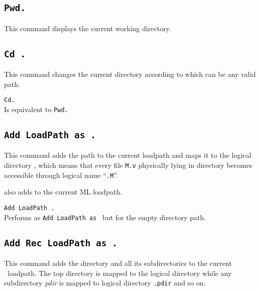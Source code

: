 \subsection[\tt Pwd.]{\tt Pwd.\label{Pwd}}
This command displays the current working directory.

\subsection[\tt Cd {\str}.]{\tt Cd {\str}.}
This command changes the current directory according to {\str} 
which can be any valid path.

\begin{Variants}
\item {\tt Cd.}\\
  Is equivalent to {\tt Pwd.}
\end{Variants}

\subsection[\tt Add LoadPath {\str} as {\dirpath}.]{\tt Add LoadPath {\str} as {\dirpath}.\label{AddLoadPath}}

This command adds the path {\str} to the current {\Coq} loadpath and
maps it to the logical directory {\dirpath}, which means that every
file {\tt M.v} physically lying in directory {\str} becomes accessible
through logical name ``{\dirpath}{\tt{.M}}''. 

 also adds {\str} to the current ML loadpath.

\begin{Variants}
\item {\tt Add LoadPath {\str}.}\\
Performs as {\tt Add LoadPath {\str} as {\dirpath}} but for the empty directory path.
\end{Variants}

\subsection[\tt Add Rec LoadPath {\str} as {\dirpath}.]{\tt Add Rec LoadPath {\str} as {\dirpath}.\label{AddRecLoadPath}}
This command adds the directory {\str} and all its subdirectories 
to the current \Coq\ loadpath. The top directory {\str} is mapped to the logical directory {\dirpath} while any subdirectory {\textsl{pdir}} is mapped to logical directory {\dirpath}{\tt{.pdir}} and so on.

